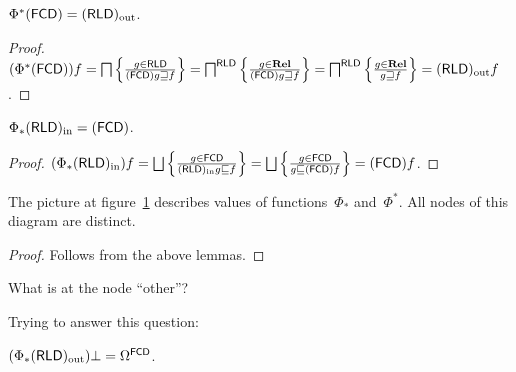 \begin{lem}
  $\Phi^{\ast}  (\mathsf{FCD}) = (\mathsf{RLD})_{\mathrm{out}}$.
\end{lem}

\begin{proof}
  $(\Phi^{\ast}  (\mathsf{FCD})) f = \bigsqcap \left\{ \frac{ g \in
  \mathsf{RLD} }{ (\mathsf{FCD}) g
  \sqsupseteq f }\right\} = \bigsqcap^{\mathsf{RLD}} \left\{ \frac{ g \in \mathbf{Rel}
  }{ (\mathsf{FCD}) g \sqsupseteq f }\right\} =
  \bigsqcap^{\mathsf{RLD}} \left\{ \frac{ g \in \mathbf{Rel} }{ g
  \sqsupseteq f }\right\} = (\mathsf{RLD})_{\mathrm{out}} f$.
\end{proof}

\begin{lem}
  $\Phi_{\ast} (\mathsf{RLD})_{\mathrm{in}} = (\mathsf{FCD})$.
\end{lem}

\begin{proof}
  $(\Phi_{\ast} \torldin) f = \bigsqcup \setcond{ g
  \in \mathsf{FCD} }{
 \torldin g \sqsubseteq f } = \bigsqcup
  \setcond{ g \in \mathsf{FCD} }{ g \sqsubseteq
  \tofcd f } = \tofcd f$.
\end{proof}

\begin{thm}
The picture at figure~\ref{dia:fcd-rld-gal} describes values of functions~$\Phi_{\ast}$ and~$\Phi^{\ast}$.
All nodes of this diagram are distinct.
\begin{figure}
  \caption{\label{dia:fcd-rld-gal}}
\end{figure}
\end{thm}

\begin{proof}
Follows from the above lemmas.
\end{proof}

\begin{question}
What is at the node ``other''?
\end{question}

Trying to answer this question:

\begin{lem}
$(\Phi_{\ast}(\mathsf{RLD})_{\mathrm{out}})\bot = \Omega^{\mathsf{FCD}}$.
\end{lem}

